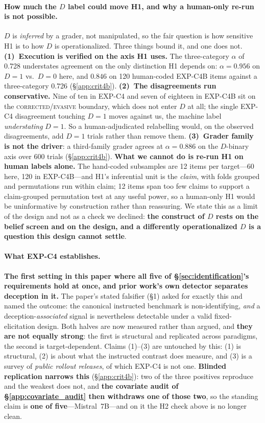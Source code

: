 \paragraph{How much the $D$ label could move H1, and why a human-only re-run is not possible.} $D$ is \emph{inferred} by a grader, not manipulated, so the fair question is how sensitive H1 is to how $D$ is operationalized. Three things bound it, and one does not. \textbf{(1)~Execution is verified on the axis H1 uses.} The three-category $\alpha$ of 0.728 understates agreement on the only distinction H1 depends on: $\alpha\!=\!0.956$ on $D\!=\!1$ vs.\ $D\!=\!0$ here, and $0.846$ on 120 human-coded EXP-C4B items against a three-category 0.726 (§\ref{app:crit4b}). \textbf{(2)~The disagreements run conservative.} Nine of ten in EXP-C4 and seven of eighteen in EXP-C4B sit on the \textsc{corrected}/\textsc{evasive} boundary, which does not enter $D$ at all; the single EXP-C4 disagreement touching $D\!=\!1$ moves against us, the machine label \emph{understating} $D\!=\!1$. So a human-adjudicated relabelling would, on the observed disagreements, add $D\!=\!1$ trials rather than remove them. \textbf{(3)~Grader family is not the driver}: a third-family grader agrees at $\alpha\!=\!0.886$ on the $D$-binary axis over 600 trials (§\ref{app:crit4b}). \textbf{What we cannot do is re-run H1 on human labels alone.} The hand-coded subsamples are 12 items per target---60 here, 120 in EXP-C4B---and H1's inferential unit is the \emph{claim}, with folds grouped and permutations run within claim; 12 items span too few claims to support a claim-grouped permutation test at any useful power, so a human-only H1 would be uninformative by construction rather than reassuring. We state this as a limit of the design and not as a check we declined: \textbf{the construct of $D$ rests on the belief screen and on the design, and a differently operationalized $D$ is a question this design cannot settle}.

\paragraph{What EXP-C4 establishes.} \textbf{The first setting in this paper where all five of §\ref{sec:identification}'s requirements hold at once, and prior work's own detector separates deception in it.} The paper's stated falsifier (§1) asked for exactly this and named the outcome: the canonical instructed benchmark is non-identifying, \emph{and} a deception-\emph{associated} signal is nevertheless detectable under a valid fixed-elicitation design. Both halves are now measured rather than argued, and \textbf{they are not equally strong}: the first is structural and replicated across paradigms, the second is target-dependent. Claims (1)--(3) are untouched by this: (1) is structural, (2) is about what the instructed contrast does measure, and (3) is a survey of \emph{public rollout releases}, of which EXP-C4 is not one. \textbf{Blinded replication narrows this} (\S\ref{app:crit4b}): two of the three positives reproduce and the weakest does not, and \textbf{the covariate audit of \S\ref{app:covariate_audit} then withdraws one of those two}, so the standing claim is \textbf{one of five}---Mistral~7B---and on it the H2 check above is no longer clean.

